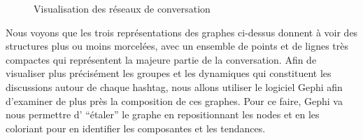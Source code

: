 \begin{figure}
    \centering
\centering



  
    \caption{Visualisation des réseaux de conversation}
\end{figure}


Nous voyons que les trois repr\'esentations des graphes ci-dessus
donnent \`a voir des structures plus ou moins morcel\'ees, avec un
ensemble de points et de lignes tr\`es compactes qui repr\'esentent la
majeure partie de la conversation. Afin de visualiser plus
pr\'ecis\'ement les groupes et les dynamiques qui constituent les
discussions autour de chaque hashtag, nous allons utiliser le logiciel
Gephi \citep{Bastian2013} afin d{\textquoteright}examiner de plus pr\`es la
composition de ces graphes. Pour ce faire, Gephi va nous permettre
d{\textquoteright} {\textquotedblleft}\'etaler{\textquotedblright} le
graphe en repositionnant les nodes et en les coloriant pour en
identifier les composantes et les tendances.

